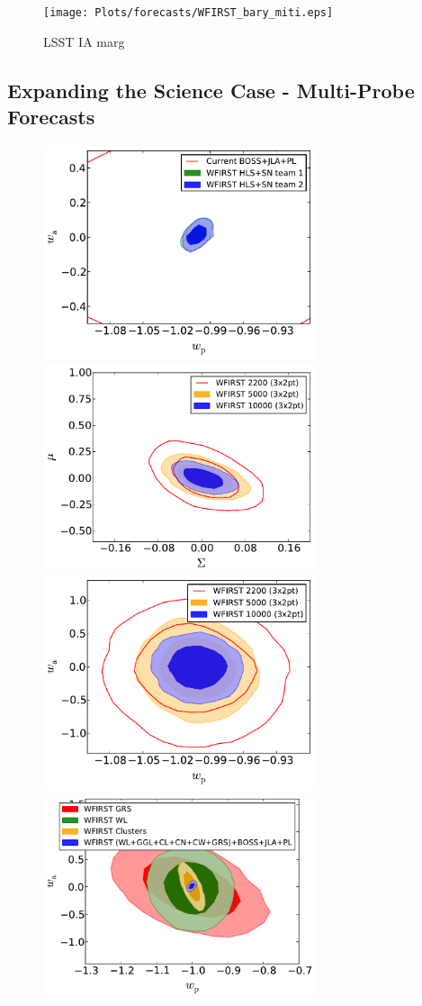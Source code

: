 \begin{figure}
\texttt{[image: Plots/forecasts/WFIRST\_bary\_miti.eps]}
\caption{LSST IA marg}
         \label{fi:lsst1}
\end{figure}


\subsection{Expanding the Science Case - Multi-Probe Forecasts}
\begin{figure}
\includegraphics[width=8cm]{Plots/forecasts/WFIRST_2SNteams_zoom.pdf}
\includegraphics[width=8cm]{Plots/forecasts/WFIRST_extended_MG.pdf}
\includegraphics[width=8cm]{Plots/forecasts/WFIRST_extended.pdf}
\includegraphics[width=8cm]{Plots/forecasts/WFIRST_ini_vs_multi.pdf}

\end{figure}
